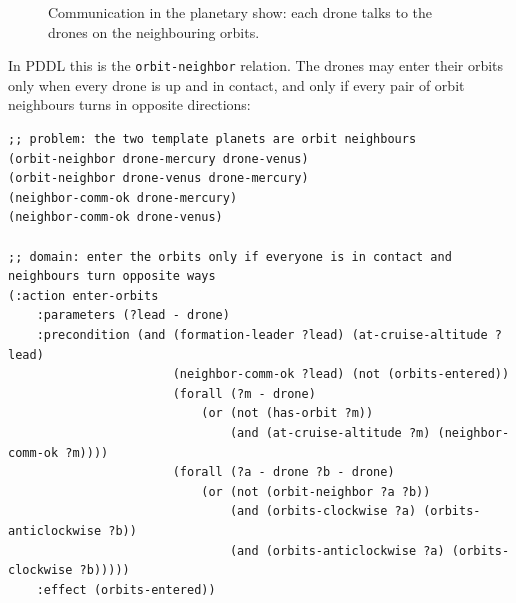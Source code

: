 \documentclass[11pt,a4paper,oneside]{report}
\newcommand{\code}[1]{\texttt{#1}}
\begin{document}
\begin{figure}[H]
\centering
{}
\caption[Communication in the planetary show]{Communication in the planetary show: each drone
talks to the drones on the neighbouring orbits.}
\label{fig:comm-planets}
\end{figure}

\noindent In PDDL this is the \code{orbit-neighbor} relation. The drones may enter their orbits
only when every drone is up and in contact, and only if every pair of orbit neighbours turns in
opposite directions:

\begin{lstlisting}
;; problem: the two template planets are orbit neighbours
(orbit-neighbor drone-mercury drone-venus)
(orbit-neighbor drone-venus drone-mercury)
(neighbor-comm-ok drone-mercury)
(neighbor-comm-ok drone-venus)

;; domain: enter the orbits only if everyone is in contact and neighbours turn opposite ways
(:action enter-orbits
    :parameters (?lead - drone)
    :precondition (and (formation-leader ?lead) (at-cruise-altitude ?lead)
                       (neighbor-comm-ok ?lead) (not (orbits-entered))
                       (forall (?m - drone)
                           (or (not (has-orbit ?m))
                               (and (at-cruise-altitude ?m) (neighbor-comm-ok ?m))))
                       (forall (?a - drone ?b - drone)
                           (or (not (orbit-neighbor ?a ?b))
                               (and (orbits-clockwise ?a) (orbits-anticlockwise ?b))
                               (and (orbits-anticlockwise ?a) (orbits-clockwise ?b)))))
    :effect (orbits-entered))
\end{lstlisting}
\end{document}
